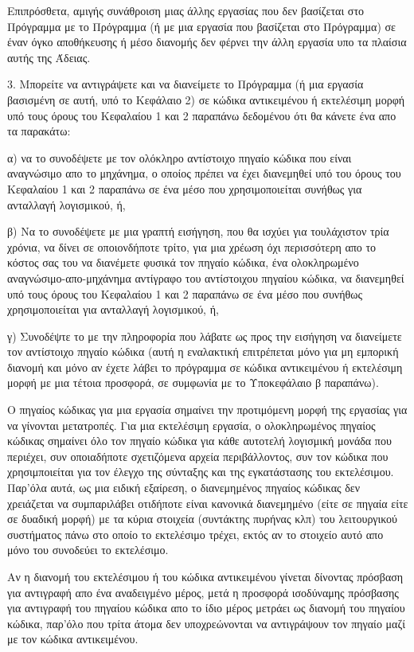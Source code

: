\begin{small}
Επιπρόσθετα, αμιγής συνάθροιση μιας άλλης εργασίας που δεν βασίζεται στο Πρόγραμμα με το Πρόγραμμα (ή με μια εργασία που βασίζεται στο Πρόγραμμα) σε έναν όγκο αποθήκευσης ή μέσο διανομής δεν φέρνει την άλλη εργασία υπο τα πλαίσια αυτής της Άδειας.

3. Μπορείτε να αντιγράψετε και να διανείμετε το Πρόγραμμα (ή μια εργασία βασισμένη σε αυτή, υπό το Κεφάλαιο 2) σε κώδικα αντικειμένου ή εκτελέσιμη μορφή υπό τους όρους του Κεφαλαίου 1 και 2 παραπάνω δεδομένου ότι θα κάνετε ένα απο τα παρακάτω:

    α) να το συνοδέψετε με τον ολόκληρο αντίστοιχο πηγαίο κώδικα που είναι αναγνώσιμο απο το μηχάνημα, ο οποίος πρέπει να έχει διανεμηθεί υπό του όρους του Κεφαλαίου 1 και 2 παραπάνω σε ένα μέσο που χρησιμοποιείται συνήθως για ανταλλαγή λογισμικού, ή, 

    β)  Να το συνοδέψετε με μια γραπτή εισήγηση, που θα ισχύει για τουλάχιστον τρία χρόνια, να δίνει σε οποιονδήποτε τρίτο, για μια χρέωση όχι περισσότερη απο το κόστος σας του να διανέμετε φυσικά τον πηγαίο κώδικα, ένα ολοκληρωμένο αναγνώσιμο-απο-μηχάνημα αντίγραφο του αντίστοιχου πηγαίου κώδικα, να διανεμηθεί υπό τους όρους του Κεφαλαίου 1 και 2 παραπάνω σε ένα μέσο που συνήθως χρησιμοποιείται για ανταλλαγή λογισμικού, ή, 

    γ)  Συνοδέψτε το με την πληροφορία που λάβατε ως προς την εισήγηση να διανείμετε τον αντίστοιχο πηγαίο κώδικα (αυτή η εναλακτική επιτρέπεται μόνο για μη εμπορική διανομή και μόνο αν έχετε λάβει το πρόγραμμα σε κώδικα αντικειμένου ή εκτελέσιμη μορφή με μια τέτοια προσφορά, σε συμφωνία με το Υποκεφάλαιο β παραπάνω). 

Ο πηγαίος κώδικας για μια εργασία σημαίνει την προτιμόμενη μορφή της εργασίας για να γίνονται μετατροπές. Για μια εκτελέσιμη εργασία, ο ολοκληρωμένος πηγαίος κώδικας σημαίνει όλο τον πηγαίο κώδικα για κάθε αυτοτελή λογισμική μονάδα που περιέχει, συν οποιαδήποτε σχετιζόμενα αρχεία περιβάλλοντος, συν τον κώδικα που χρησιμποιείται για τον έλεγχο της σύνταξης και της εγκατάστασης του εκτελέσιμου. Παρ'όλα αυτά, ως μια ειδική εξαίρεση, ο διανεμημένος πηγαίος κώδικας δεν χρειάζεται να συμπαριλάβει οτιδήποτε είναι κανονικά διανεμημένο (είτε σε πηγαία είτε σε δυαδική μορφή) με τα κύρια στοιχεία (συντάκτης πυρήνας κλπ) του λειτουργικού συστήματος πάνω στο οποίο το εκτελέσιμο τρέχει, εκτός αν το στοιχείο αυτό απο μόνο του συνοδεύει το εκτελέσιμο.

Αν η διανομή του εκτελέσιμου ή του κώδικα αντικειμένου γίνεται δίνοντας πρόσβαση για αντιγραφή απο ένα αναδειγμένο μέρος, μετά η προσφορά ισοδύναμης πρόσβασης για αντιγραφή του πηγαίου κώδικα απο το ίδιο μέρος μετράει ως διανομή του πηγαίου κώδικα, παρ'όλο που τρίτα άτομα δεν υποχρεώνονται να αντιγράψουν τον πηγαίο μαζί με τον κώδικα αντικειμένου.


\end{small}
